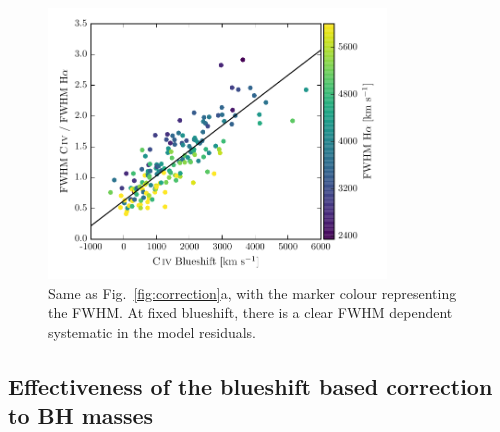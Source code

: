 \begin{figure}
    \centering 
    \includegraphics[width=0.8\textwidth]{figures/chapter03/fwhm_correction_color.pdf}  
    \caption{Same as Fig.~\ref{fig:correction}a, with the marker colour representing the \ha FWHM. At fixed  blueshift, there is a clear \ha FWHM dependent systematic in the model residuals.}   
    \label{fig:residuals_ha_fwhm}
\end{figure}

\subsection{Effectiveness of the  blueshift based correction to BH masses}
\label{sec:effectiveness}

